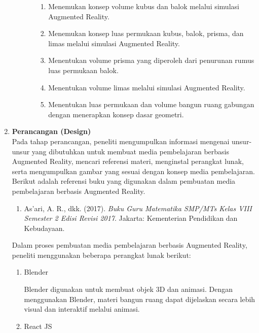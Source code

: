 \documentclass[12pt]{article}
\begin{document}
\begin{enumerate}[leftmargin=1cm, label=\arabic*.]
\begin{enumerate}[label=\textbf{\alph*.}]
\begin{enumerate}
            \begin{enumerate}[label=\arabic*.]
                \item Menemukan konsep volume kubus dan balok melalui simulasi Augmented Reality.
                \item Menemukan konsep luas permukaan kubus, balok, prisma, dan limas melalui simulasi Augmented Reality.
                \item Menentukan volume prisma yang diperoleh dari penurunan rumus luas permukaan balok.
                \item Menentukan volume limas melalui simulasi Augmented Reality.
                \item Menentukan luas permukaan dan volume bangun ruang gabungan dengan menerapkan konsep dasar geometri.
            \end{enumerate}
        \end{enumerate}
    \end{enumerate}
    \item \textbf{Perancangan (Design)}\\
    \hspace*{1cm}Pada tahap perancangan, peneliti mengumpulkan informasi mengenai unsur-unsur yang dibutuhkan untuk membuat media pembelajaran berbasis Augmented Reality, mencari referensi materi, menginstal perangkat lunak, serta mengumpulkan gambar yang sesuai dengan konsep media pembelajaran. Berikut adalah referensi buku yang digunakan dalam pembuatan media pembelajaran berbasis Augmented Reality.
    \begin{enumerate}[label=\alph*)]
        \item As'ari, A. R., dkk. (2017). \textit{Buku Guru Matematika SMP/MTs Kelas VIII Semester 2 Edisi Revisi 2017}. Jakarta: Kementerian Pendidikan dan Kebudayaan.
    \end{enumerate}

    \hspace*{1cm}Dalam proses pembuatan media pembelajaran berbasis Augmented Reality, peneliti menggunakan beberapa perangkat lunak berikut:

    \begin{enumerate}[label=\alph*)]
        \item Blender

        Blender digunakan untuk membuat objek 3D dan animasi. Dengan menggunakan Blender, materi bangun ruang dapat dijelaskan secara lebih visual dan interaktif melalui animasi.

        \item React JS


\end{enumerate}
\end{enumerate}
\end{document}

